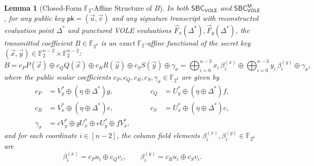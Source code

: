 \documentclass[11pt,a4paper]{article}
\newtheorem{lemma}{Lemma}
\theoremstyle{definition}
\theoremstyle{remark}
\newcommand{\Ftwo}{\mathbb{F}_2}
\newcommand{\Ftwok}{\mathbb{F}_{2^k}}
\newcommand{\SBCVOLE}{\mathsf{SBC}_{\mathsf{VOLE}}}
\newcommand{\SBCVOLEM}{\mathsf{SBC}_{\mathsf{VOLE}}^{\mathsf{M}}}
\newcommand{\pk}{\mathsf{pk}}
\begin{document}
\begin{lemma}[Closed-Form $\Ftwo$-Affine Structure of $B$]
\label{thm:B-affine}
In both $\SBCVOLE$ and $\SBCVOLEM$, for any public key $\pk = (\vec{u}, \vec{v})$ and any signature transcript with reconstructed evaluation point $\Delta^*$ and punctured VOLE evaluations $\vec{F}_x(\Delta^*), \vec{F}_y(\Delta^*)$, the transmitted coefficient $B \in \Ftwok$ is an exact $\Ftwo$-affine functional of the secret key $(\vec{x}, \vec{y}) \in \Ftwo^{n-2} \times \Ftwo^{n-2}$:
\begin{equation}
\label{eq:B-closed}
B = c_P P(\vec{x}) \oplus c_Q Q(\vec{x}) \oplus c_R R(\vec{y}) \oplus c_S S(\vec{y}) \oplus \gamma_\sigma
  = \bigoplus_{i=0}^{n-3} x_i \, \beta_i^{(x)} \oplus \bigoplus_{i=0}^{n-3} y_i \, \beta_i^{(y)} \oplus \gamma_\sigma,
\end{equation}
where the public scalar coefficients $c_P, c_Q, c_R, c_S, \gamma_\sigma \in \Ftwok$ are given by
\begin{equation}
\label{eq:cPQRS}
\begin{aligned}
c_P &= V_y^* \oplus (\eta \oplus \Delta^*) g, &\qquad c_Q &= U_y^* \oplus (\eta \oplus \Delta^*) f, \\
c_R &= V_x^* \oplus (\eta \oplus \Delta^*) e, &\qquad c_S &= U_x^* \oplus (\eta \oplus \Delta^*) c, \\
\gamma_\sigma &= c V_y^* \oplus g U_x^* \oplus e U_y^* \oplus f V_x^*,
\end{aligned}
\end{equation}
and for each coordinate $i \in [n-2]$, the column field elements $\beta_i^{(x)}, \beta_i^{(y)} \in \Ftwok$ are
\begin{equation}
\label{eq:beta-cols}
\beta_i^{(x)} = c_P u_i \oplus c_Q v_i, \qquad \beta_i^{(y)} = c_R u_i \oplus c_S v_i.
\end{equation}
\end{lemma}
\end{document}
